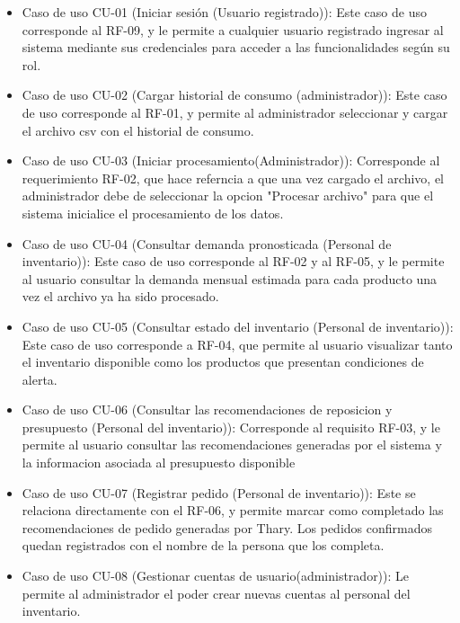 \begin{itemize}

    \item Caso de uso CU-01 (Iniciar sesión (Usuario registrado)): Este caso de uso corresponde al RF-09, y le permite a cualquier usuario registrado ingresar al sistema mediante sus credenciales para acceder a las funcionalidades según su rol.

    \item Caso de uso CU-02 (Cargar historial de consumo (administrador)): Este caso de uso corresponde al RF-01, y permite al administrador seleccionar y cargar el archivo csv con el historial de consumo.

    \item Caso de uso CU-03 (Iniciar procesamiento(Administrador)): Corresponde al requerimiento RF-02, que hace referncia a que una vez cargado el archivo, el administrador debe de seleccionar la opcion "Procesar archivo" para que el sistema inicialice el procesamiento de los datos. 

    \item Caso de uso CU-04 (Consultar demanda pronosticada (Personal de inventario)): Este caso de uso corresponde al RF-02 y al RF-05, y le permite al usuario consultar la demanda mensual estimada para cada producto una vez el archivo ya ha sido procesado.

    \item Caso de uso CU-05 (Consultar estado del inventario (Personal de inventario)): Este caso de uso corresponde a RF-04, que permite al usuario visualizar tanto el inventario disponible como los productos que presentan condiciones de alerta.

    \item Caso de uso CU-06 (Consultar las recomendaciones de reposicion y presupuesto (Personal del inventario)): Corresponde al requisito RF-03, y le permite al usuario consultar las recomendaciones generadas por el sistema y la informacion asociada al presupuesto disponible

    \item Caso de uso CU-07 (Registrar pedido (Personal de inventario)): Este se relaciona directamente con el RF-06, y permite marcar como completado las recomendaciones de pedido generadas por Thary. Los pedidos confirmados quedan registrados con el nombre de la persona que los completa.

    \item Caso de uso CU-08 (Gestionar cuentas de usuario(administrador)): Le permite al administrador el poder crear nuevas cuentas al personal del inventario.
    

\end{itemize}
